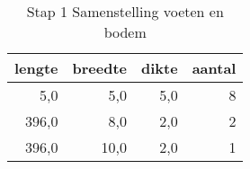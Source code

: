 \begin{table}[h!]
\centering
\caption{Stap 1 Samenstelling voeten en bodem}
\begin{tabular}{rrrr}
\toprule
 lengte &  breedte &  dikte &  aantal \\
\midrule
    5,0 &      5,0 &    5,0 &       8 \\
  396,0 &      8,0 &    2,0 &       2 \\
  396,0 &     10,0 &    2,0 &       1 \\
\bottomrule
\end{tabular}
\end{table}
